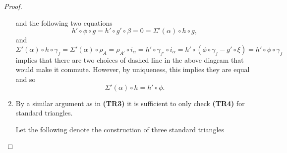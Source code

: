 \begin{proof}
\begin{enumerate}[label={(\bfseries TR\arabic*)}]
{\begin{center}
            \end{center}
            and the following two equations
            \[
                h' \circ \phi \circ g = h' \circ g' \circ \beta = 0 = \Sigma'(\alpha) \circ h \circ g,
            \]
            and
            \[
                \Sigma'(\alpha) \circ h \circ \gamma_f = \Sigma'(\alpha) \circ \rho_A = \rho_{A'} \circ i_{\alpha} = h' \circ \gamma_{f'} \circ i_{\alpha} = h' \circ (\phi \circ \gamma_f - g' \circ \xi) = h' \circ \phi \circ \gamma_f
            \]
            implies that there are two choices of dashed line in the above diagram that would make it commute. However, by uniqueness, this implies they are equal and so
            \[
                \Sigma'(\alpha) \circ h = h' \circ \phi.
            \]
        }
        \item {
            By a similar argument as in {\bf (TR3)} it is sufficient to only check {\bf (TR4)} for standard triangles.

            Let the following denote the construction of three standard triangles
            \begin{center}
\end{center}}
\end{enumerate}
\end{proof}
